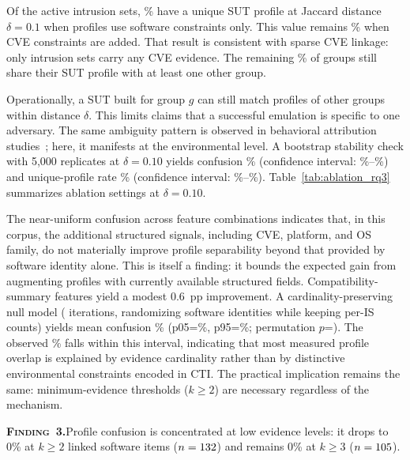 \documentclass[sigconf,anonymous,review]{acmart}
\newcommand{\finding}[2]{%
  \begin{findingenv}%
    \textsc{\textbf{Finding~#1.}}\enspace #2%
  \end{findingenv}%
}
\begin{document}
Of the \enterpriseactiveintrusionsetcount{} active intrusion sets, \sutprofileuniquesoftwarepercentage\% have a unique SUT profile at Jaccard distance $\delta = 0.1$ when profiles use software constraints only. This value remains \sutprofileuniquesoftwarecvepercentage\% when CVE constraints are added. That result is consistent with sparse CVE linkage: only \entintrusionsetswithcvecount{} intrusion sets carry any CVE evidence. The remaining \sutprofileconfusionsoftwarecvepercentage\% of groups still share their SUT profile with at least one other group.

Operationally, a SUT built for group $g$ can still match profiles of other groups within distance $\delta$. This limits claims that a successful emulation is specific to one adversary. The same ambiguity pattern is observed in behavioral attribution studies~\cite{DBLP:conf/uss/SahaMBCVL25}; here, it manifests at the environmental level. A bootstrap stability check with 5{,}000 replicates at $\delta = 0.10$ yields confusion \bootstrapconfusionpct\% (confidence interval: \bootstrapconfusioncilow{}\%--\bootstrapconfusioncihigh{}\%) and unique-profile rate \bootstrapuniquepct\% (confidence interval: \bootstrapuniquecilow{}\%--\bootstrapuniquecihigh{}\%). Table~\ref{tab:ablation_rq3} summarizes ablation settings at $\delta = 0.10$.

The near-uniform confusion across feature combinations indicates that, in this corpus, the additional structured signals, including CVE, platform, and OS family, do not materially improve profile separability beyond that provided by software identity alone. This is itself a finding: it bounds the expected gain from augmenting profiles with currently available structured fields. Compatibility-summary features yield a modest 0.6~pp improvement. A cardinality-preserving null model (\nullmodeliterations{} iterations, randomizing software identities while keeping per-IS counts) yields mean confusion \nullmodelconfusionmeanpct\% (p05=\nullmodelconfusionplowpct\%, p95=\nullmodelconfusionphighpct\%; permutation $p$=\nullmodelpvalue{}). The observed \nullmodelobservedconfusionpct\% falls within this interval, indicating that most measured profile overlap is explained by evidence cardinality rather than by distinctive environmental constraints encoded in CTI. The practical implication remains the same: minimum-evidence thresholds ($k \geq 2$) are necessary regardless of the mechanism.

\finding{3}{Profile confusion is concentrated at low evidence levels: it drops to 0\% at $k \geq 2$ linked software items (\(n=132\)) and remains 0\% at $k \geq 3$ (\(n=105\)).}
\end{document}
